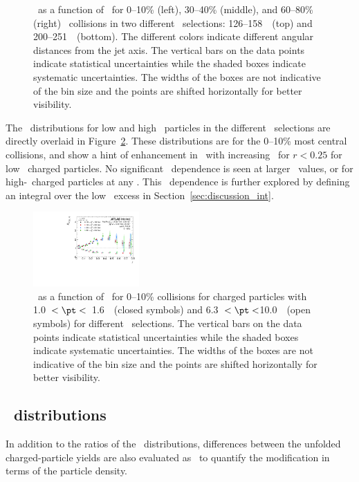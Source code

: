\begin{figure}[h]
{\begin{tabular}{ccc}
\end{tabular}}
\caption{\RDptr\ as a function of \pt\ for  0--10\% (left), 30--40\% (middle), and 60--80\% (right) \PbPb\ collisions in two different \ptjet\ selections: 126--158~\GeV\ (top) and 200--251~\GeV\ (bottom).
The different colors indicate different angular distances from the jet axis.
The vertical bars on the data points indicate statistical uncertainties while the shaded boxes indicate systematic uncertainties.
The widths of the boxes are not indicative of the bin size and the points are shifted horizontally for better visibility.}
\label{fig:pttrkdep}
\end{figure}


The \RDptr\ distributions for low and high \pt\ particles in the different \ptjet\ selections are directly overlaid in Figure~\ref{fig:ptjetdep}.
These distributions are for the 0--10\% most central collisions, and show a hint of enhancement in \RDptr\ with increasing \ptjet\  for $r < 0.25$ for low  \pt\ charged particles.
No significant \ptjet\ dependence is seen at larger \rvar\ values, or for high-\pt\ charged particles at any \rvar.
This \ptjet\ dependence is further explored by defining an integral over the low \pt\ excess in Section~\ref{sec:discussion_int}.

\begin{figure}[ht]
\centerline{
\includegraphics[width=0.36\textwidth]{figures/results/RDpT_dR_trk3_trk6_cent0}}
\caption{\RDptr\ as a function of \rvar\ for 0--10\% collisions for charged particles with 1.0~$< \pt <$~1.6~\GeV\ (closed symbols) and 6.3~$< \pt <$10.0~\GeV\ (open symbols) for different \ptjet\ selections.
The vertical bars on the data points indicate statistical uncertainties while the shaded boxes indicate systematic uncertainties.
The widths of the boxes are not indicative of the bin size and the points are shifted horizontally for better visibility.}
\label{fig:ptjetdep}
\end{figure}



\subsection{\DeltaDptr\ distributions}
\label{sec:delta_dptr}
In addition to the ratios of the \Dptr\ distributions, differences between the unfolded charged-particle yields are also evaluated as \DeltaDptr\ to quantify the modification in terms of the particle density.

